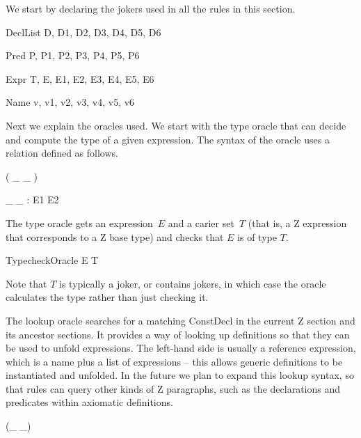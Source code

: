 \documentclass{entcs}
\begin{document}
We start by declaring the jokers used in all the rules in this section.

\begin{zedjoker}{DeclList} D, D1, D2, D3, D4, D5, D6 \end{zedjoker}
\begin{zedjoker}{Pred} P, P1, P2, P3, P4, P5, P6 \end{zedjoker}
\begin{zedjoker}{Expr} T, E, E1, E2, E3, E4, E5, E6 \end{zedjoker}
\begin{zedjoker}{Name} v, v1, v2, v3, v4, v5, v6 \end{zedjoker}

Next we explain the oracles used.  We start with the type oracle that
can decide and compute the type of a given expression.  The syntax of
the oracle uses a relation defined as follows.

\begin{zed}
  \relation ( \_ \hasType \_ )
\end{zed}

\begin{gendef}[E1,E2]
  \_ \hasType \_ : E1 \rel E2
\end{gendef}

The type oracle gets an expression~$E$ and a carier set~$T$ (that is,
a Z expression that corresponds to a Z base type) and checks that $E$
is of type $T$.

\begin{zedproviso}{TypecheckOracle}
  E \hasType T
\end{zedproviso}

Note that $T$ is typically a joker, or contains jokers, in which case
the oracle calculates the type rather than just checking it.

The lookup oracle searches for a matching ConstDecl in the current Z
section and its ancestor sections.  It provides a way of looking up
definitions so that they can be used to unfold expressions.  The
left-hand side is usually a reference expression, which is a name plus
a list of expressions -- this allows generic definitions to be
instantiated and unfolded.  In the future we plan to expand this
lookup syntax, so that rules can query other kinds of Z paragraphs,
such as the declarations and predicates within axiomatic definitions.

\begin{zed}
  \relation (\_ \hasDefn \_)
\end{zed}
\end{document}
